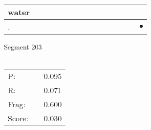 \documentclass[landscape]{article}
\newcommand{\ssp}{\hspace{2pt}}
\newcommand{\mex}{\cellcolor{g}$\bullet$}
\begin{document}
\begin{tabular}{|l|p{10pt}|p{10pt}|p{10pt}|p{10pt}|p{10pt}|p{10pt}|p{10pt}|p{10pt}|p{10pt}|p{10pt}|p{10pt}|p{10pt}|p{10pt}|p{10pt}|}
\hline
\ssp water \ssp&\hspace{2pt}&\hspace{2pt}&\hspace{2pt}&\hspace{2pt}&\hspace{2pt}&\hspace{2pt}&\hspace{2pt}&\hspace{2pt}&\hspace{2pt}&\hspace{2pt}&\hspace{2pt}&\hspace{2pt}&\hspace{2pt}&\hspace{2pt}\\
\hline
\ssp \cellcolor{ref13}. \ssp&\hspace{2pt}&\hspace{2pt}&\hspace{2pt}&\hspace{2pt}&\hspace{2pt}&\hspace{2pt}&\hspace{2pt}&\hspace{2pt}&\hspace{2pt}&\hspace{2pt}&\hspace{2pt}&\hspace{2pt}&\hspace{2pt}&\hspace{2pt}\mex\\
\hline
\end{tabular}

\vspace{6pt}
\noindent Segment 203\\\\
\noindent\begin{tabular}{lm{12pt}r}
\hline
P:&&0.095\\
R:&&0.071\\
Frag:&&0.600\\
Score:&&0.030\\
\end{tabular}

\newpage
\end{document}
